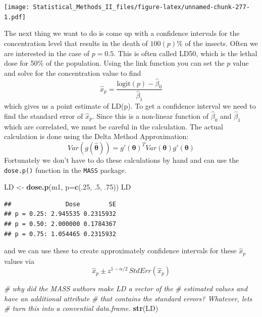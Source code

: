 \documentclass[]{book}
\newenvironment{Shaded}{\begin{snugshade}}{\end{snugshade}}
\newcommand{\KeywordTok}[1]{\textcolor[rgb]{0.13,0.29,0.53}{\textbf{{#1}}}}
\newcommand{\DataTypeTok}[1]{\textcolor[rgb]{0.13,0.29,0.53}{{#1}}}
\newcommand{\DecValTok}[1]{\textcolor[rgb]{0.00,0.00,0.81}{{#1}}}
\newcommand{\StringTok}[1]{\textcolor[rgb]{0.31,0.60,0.02}{{#1}}}
\newcommand{\CommentTok}[1]{\textcolor[rgb]{0.56,0.35,0.01}{\textit{{#1}}}}
\newcommand{\NormalTok}[1]{{#1}}
\theoremstyle{definition}
\theoremstyle{definition}
\theoremstyle{remark}
\begin{document}
\texttt{[image: Statistical\_Methods\_II\_files/figure-latex/unnamed-chunk-277-1.pdf]}

The next thing we want to do is come up with a confidence intervals for
the concentration level that results in the death of \(100(p)\%\) of the
insects. Often we are interested in the case of \(p=0.5\). This is often
called LD50, which is the lethal dose for 50\% of the population. Using
the link function you can set the \(p\) value and solve for the
concentration value to find
\[\hat{x}_{p}=\frac{\textrm{logit}\left(p\right)-\hat{\beta}_{0}}{\hat{\beta}_{1}}\]
which gives us a point estimate of LD(p). To get a confidence interval
we need to find the standard error of \(\hat{x}_{p}\). Since this is a
non-linear function of \(\hat{\beta}_{0}\) and \(\hat{\beta}_{1}\) which
are correlated, we must be careful in the calculation. The actual
calculation is done using the Delta Method Approximation:
\[Var\left(g\left(\hat{\boldsymbol{\theta}}\right)\right)=g'\left(\boldsymbol{\theta}\right)^{T}Var\left(\boldsymbol{\theta}\right)g'\left(\boldsymbol{\theta}\right)\]
Fortunately we don't have to do these calculations by hand and can use
the \texttt{dose.p()} function in the \texttt{MASS} package.

\begin{Shaded}
\begin{Highlighting}[]
\NormalTok{LD <-}\StringTok{ }\KeywordTok{dose.p}\NormalTok{(m1, }\DataTypeTok{p=}\KeywordTok{c}\NormalTok{(.}\DecValTok{25}\NormalTok{, .}\DecValTok{5}\NormalTok{, .}\DecValTok{75}\NormalTok{))}
\NormalTok{LD}
\end{Highlighting}
\end{Shaded}

\begin{verbatim}
##               Dose        SE
## p = 0.25: 2.945535 0.2315932
## p = 0.50: 2.000000 0.1784367
## p = 0.75: 1.054465 0.2315932
\end{verbatim}

and we can use these to create approximately confidence intervals for
these \(\hat{x}_{p}\) values via
\[\hat{x}_{p}\pm z^{1-\alpha/2}\,StdErr\left(\hat{x}_{p}\right)\]

\begin{Shaded}
\begin{Highlighting}[]
\CommentTok{# why did the MASS authors make LD a vector of the }
\CommentTok{# estimated values and have an additional attribute }
\CommentTok{# that contains the standard errors?  Whatever, lets}
\CommentTok{# turn this into a convential data.frame.}
\KeywordTok{str}\NormalTok{(LD) }
\end{Highlighting}
\end{Shaded}
\end{document}
